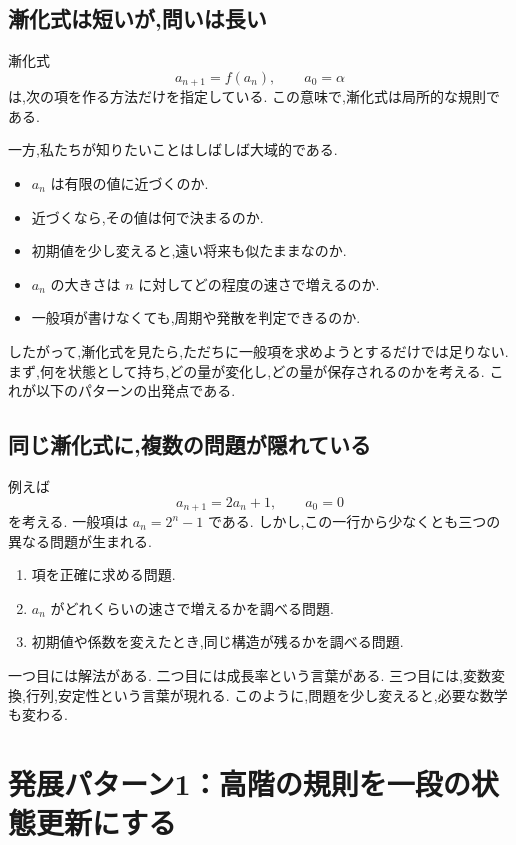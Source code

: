 \subsection{漸化式は短いが,問いは長い}

漸化式
\[
  a_{n+1}=f(a_n),\qquad a_0=\alpha
\]
は,次の項を作る方法だけを指定している.
この意味で,漸化式は局所的な規則である.

一方,私たちが知りたいことはしばしば大域的である.

\begin{itemize}
  \item $a_n$ は有限の値に近づくのか.
  \item 近づくなら,その値は何で決まるのか.
  \item 初期値を少し変えると,遠い将来も似たままなのか.
  \item $a_n$ の大きさは $n$ に対してどの程度の速さで増えるのか.
  \item 一般項が書けなくても,周期や発散を判定できるのか.
\end{itemize}

したがって,漸化式を見たら,ただちに一般項を求めようとするだけでは足りない.
まず,何を状態として持ち,どの量が変化し,どの量が保存されるのかを考える.
これが以下のパターンの出発点である.

\subsection{同じ漸化式に,複数の問題が隠れている}

例えば
\[
  a_{n+1}=2a_n+1,\qquad a_0=0
\]
を考える.
一般項は $a_n=2^n-1$ である.
しかし,この一行から少なくとも三つの異なる問題が生まれる.

\begin{enumerate}
  \item 項を正確に求める問題.
  \item $a_n$ がどれくらいの速さで増えるかを調べる問題.
  \item 初期値や係数を変えたとき,同じ構造が残るかを調べる問題.
\end{enumerate}

一つ目には解法がある.
二つ目には成長率という言葉がある.
三つ目には,変数変換,行列,安定性という言葉が現れる.
このように,問題を少し変えると,必要な数学も変わる.

\section{発展パターン1：高階の規則を一段の状態更新にする}

